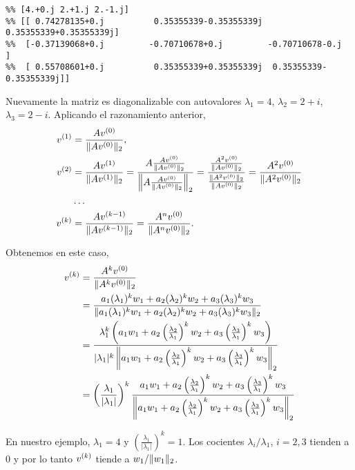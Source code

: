 \begin{verbatim}
%% [4.+0.j 2.+1.j 2.-1.j]
%% [[ 0.74278135+0.j          0.35355339-0.35355339j  0.35355339+0.35355339j]
%%  [-0.37139068+0.j         -0.70710678+0.j         -0.70710678-0.j        ]
%%  [ 0.55708601+0.j          0.35355339+0.35355339j  0.35355339-0.35355339j]]
\end{verbatim}

Nuevamente la matriz es diagonalizable con autovalores $\lambda_1 = 4$, $\lambda_2 = 2 + i$, $\lambda_3 = 2-i$.
Aplicando el razonamiento anterior,
$$
\begin{aligned}
\vb^{(1)} &= \frac{\Ab \vb^{(0)}}{\|\Ab\vb^{(0)}\|_2}, \\
\vb^{(2)} &= \frac{\Ab \vb^{(1)}}{\|\Ab\vb^{(1)}\|_2} =
 \frac{\Ab \frac{\Ab \vb^{(0)}}{\|\Ab\vb^{(0)}\|_2}}{\left\|\Ab \frac{\Ab \vb^{(0)}}{\|\Ab\vb^{(0)}\|_2}\right\|_2} =
 \frac{\frac{\Ab^2 \vb^{(0)}}{\|\Ab\vb^{(0)}\|_2}}{\frac{\|\Ab^2 \vb^{(0)}\|_2}{\|\Ab\vb^{(0)}\|_2}} =
 \frac{\Ab^2 \vb^{(0)}}{\|\Ab^2 \vb^{(0)}\|_2} \\
 &\dots \\
\vb^{(k)} &=  \frac{\Ab \vb^{(k-1)}}{\|\Ab\vb^{(k-1)}\|_2} = \frac{\Ab^n \vb^{(0)}}{\|\Ab^n\vb^{(0)}\|_2}.
\end{aligned}$$

Obtenemos en este caso,
$$
\begin{aligned}
\vb^{(k)} &= \frac{\Ab^k \vb^{(0)}}{\|\Ab^k\vb^{(0)}\|_2}  \\
&= \frac{a_1 (\lambda_1)^k \wb_1 + a_2 (\lambda_2)^k  \wb_2 + a_3 (\lambda_3)^k \wb_3}{\|a_1 (\lambda_1)^k \wb_1 + a_2 (\lambda_2)^k  \wb_2 + a_3 (\lambda_3)^k \wb_3\|_2}  \\
&=\frac{\lambda_1^k\left(a_1 \wb_1 + a_2 \left(\frac{\lambda_2}{\lambda_1}\right)^k  \wb_2 + a_3 \left(\frac{\lambda_3}{\lambda_1}\right)^k \wb_3\right)}{|\lambda_1|^k \left\|a_1 \wb_1 + a_2 \left(\frac{\lambda_2}{\lambda_1}\right)^k  \wb_2 + a_3 \left(\frac{\lambda_3}{\lambda_1}\right)^k \wb_3\right\|_2} \\
&= \left(\frac{\lambda_1}{|\lambda_1|}\right)^k \frac{a_1 \wb_1 + a_2 \left(\frac{\lambda_2}{\lambda_1}\right)^k  \wb_2 + a_3 \left(\frac{\lambda_3}{\lambda_1}\right)^k \wb_3}{\left\|a_1 \wb_1 + a_2 \left(\frac{\lambda_2}{\lambda_1}\right)^k  \wb_2 + a_3 \left(\frac{\lambda_3}{\lambda_1}\right)^k \wb_3\right\|_2}
\end{aligned}$$

En nuestro ejemplo, $\lambda_1 = 4$ y $\left(\frac{\lambda_1}{|\lambda_1|}\right)^k = 1$. Los cocientes $\lambda_i / \lambda_1$, $i = 2, 3$ tienden a $0$ y por lo tanto $\vb^{(k)}$ tiende a $\wb_1 / \|\wb_1\|_2$.

